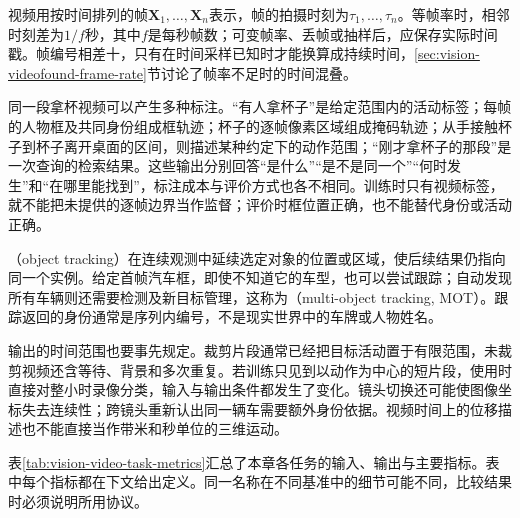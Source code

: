 视频用按时间排列的帧$\bm{X}_1,\ldots,\bm{X}_n$表示，帧的拍摄时刻为$\tau_1,\ldots,\tau_n$。等帧率时，相邻时刻差为$1/f$秒，其中$f$是每秒帧数；可变帧率、丢帧或抽样后，应保存实际时间戳。帧编号相差十，只有在时间采样已知时才能换算成持续时间，\ref{sec:vision-videofound-frame-rate}节讨论了帧率不足时的时间混叠。

\label{sec:vision-video-outputs}
同一段拿杯视频可以产生多种标注。“有人拿杯子”是给定范围内的活动标签；每帧的人物框及共同身份组成框轨迹；杯子的逐帧像素区域组成掩码轨迹；从手接触杯子到杯子离开桌面的区间，则描述某种约定下的动作范围；“刚才拿杯子的那段”是一次查询的检索结果。这些输出分别回答“是什么”“是不是同一个”“何时发生”和“在哪里能找到”，标注成本与评价方式也各不相同。训练时只有视频标签，就不能把未提供的逐帧边界当作监督；评价时框位置正确，也不能替代身份或活动正确。

（object tracking）在连续观测中延续选定对象的位置或区域，使后续结果仍指向同一个实例。给定首帧汽车框，即使不知道它的车型，也可以尝试跟踪；自动发现所有车辆则还需要检测及新目标管理，这称为（multi-object tracking, MOT）。跟踪返回的身份通常是序列内编号，不是现实世界中的车牌或人物姓名。

输出的时间范围也要事先规定。裁剪片段通常已经把目标活动置于有限范围，未裁剪视频还含等待、背景和多次重复。若训练只见到以动作为中心的短片段，使用时直接对整小时录像分类，输入与输出条件都发生了变化。镜头切换还可能使图像坐标失去连续性；跨镜头重新认出同一辆车需要额外身份依据。视频时间上的位移描述也不能直接当作带米和秒单位的三维运动。

表\ref{tab:vision-video-task-metrics}汇总了本章各任务的输入、输出与主要指标。表中每个指标都在下文给出定义。同一名称在不同基准中的细节可能不同，比较结果时必须说明所用协议。

